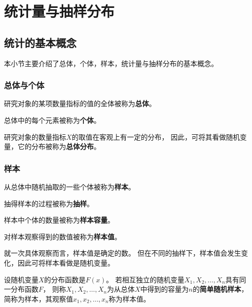 \chapter{统计量与抽样分布}

\section{统计的基本概念}
本小节主要介绍了总体，个体，样本，统计量与抽样分布的基本概念。

\subsection{总体与个体}
\begin{definition}[总体]
  研究对象的某项数量指标的值的全体被称为\textbf{总体}。
\end{definition}

\begin{definition}[个体]
  总体中的每个元素被称为\textbf{个体}。
\end{definition}

\begin{definition}[总体分布]
  研究对象的数量指标$X$的取值在客观上有一定的分布，
  因此，可将其看做随机变量，它的分布被称为\textbf{总体分布}。
\end{definition}

\subsection{样本}
\begin{definition}[样本]
  从总体中随机抽取的一些个体被称为\textbf{样本}。
\end{definition}

\begin{definition}[抽样]
  抽得样本的过程被称为\textbf{抽样}。
\end{definition}

\begin{definition}[样本容量]
  样本中个体的数量被称为\textbf{样本容量}。
\end{definition}

\begin{definition}[样本值]
  对样本观察得到的数值被称为\textbf{样本值}。
\end{definition}

就一次具体观察而言，样本值是确定的数。
但在不同的抽样下，样本值会发生变化，因此可将样本看做是随机变量。

\begin{definition}[简单随机样本]
  设随机变量$X$的分布函数是$F(x)$。
  若相互独立的随机变量$X_1,X_2,\dots,X_n$具有同一分布函数$F$，
  则称$X_1,X_2,\dots,X_n$为从总体$X$中得到的容量为$n$的\textbf{简单随机样本}，
  简称为样本，其观察值$x_1,x_2,\dots,x_n$称为样本值。
\end{definition}

